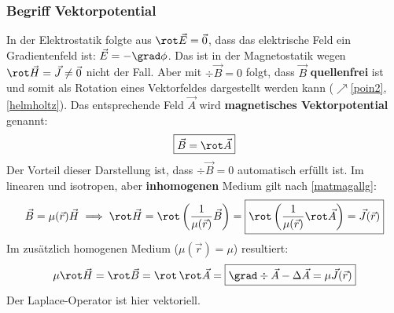 	\subsubsection{Begriff Vektorpotential}
		   In der Elektrostatik folgte aus $\rot \vec{E} = \vec{0}$, dass das elektrische Feld ein Gradientenfeld ist: $\vec{E} = -\grad \phi$.
		   Das ist in der Magnetostatik wegen \(\rot \vec{H}  = \vec{J} \neq \vec{0} \) nicht der Fall. Aber mit \(\div \vec{B}  = 0 \) folgt, dass \(\vec{B}  \) \textbf{quellenfrei} ist und somit als Rotation eines Vektorfeldes dargestellt werden kann ($\nearrow$\ref{poin2},\ref{helmholtz}). Das entsprechende Feld $ \vec{A}$ wird \textbf{magnetisches Vektorpotential} genannt:
		        \begin{equation}\label{magvekpot}\begin{split}
				        \boxed{\vec{B}  = \rot  \vec{A}}
			        \end{split}\end{equation}
		 Der Vorteil dieser Darstellung ist, dass $\div \vec{B}  = 0$ automatisch erfüllt ist. Im linearen und isotropen, aber \textbf{inhomogenen} Medium gilt nach \ref{matmagallg}: 
		        \begin{equation}\begin{split}
				      \vec{B}  = \mu(\vec{r} )\vec{H} \implies  \rot \vec{H}  = \rot \left( \dfrac{1}{\mu(\vec{r} )}  \vec{B}  \right) = \boxed{\rot \left( \dfrac{1}{\mu(\vec{r} )} \rot  \vec{A} \right) = \vec{J}(\vec{r} )}
			        \end{split}\end{equation}
		       Im zusätzlich homogenen Medium (\(\mu(\vec{r} ) = \mu \)) resultiert:
		        \begin{equation}\begin{split}
				        \mu \rot \vec{H}  = \rot \vec{B}  = \rot \, \rot  \vec{A} = \boxed{\grad \div  \vec{A} - \Delta  \vec{A}= \mu \vec{J}(\vec{r} )}
			        \end{split}\end{equation}
		        Der Laplace-Operator ist hier vektoriell.
